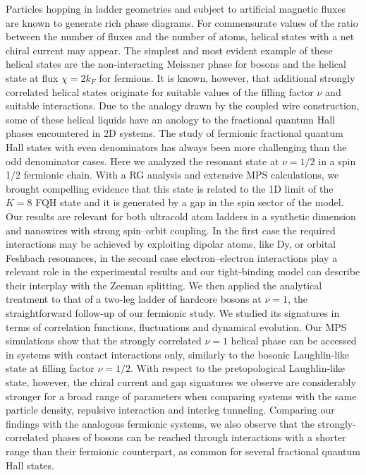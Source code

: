 Particles hopping in ladder geometries and subject to artificial magnetic fluxes are known to generate rich phase diagrams.
For commensurate values of the ratio between the number of fluxes and the number of atoms, helical states with a net chiral current may appear.
The simplest and most evident example of these helical states are the non-interacting Meissner phase for bosons and the helical state at flux $\chi = 2k_F$ for fermions.
It is known, however, that additional strongly correlated helical states originate for suitable values of the filling factor $\nu$ and suitable interactions.
Due to the analogy drawn by the coupled wire construction, some of these helical liquids have an anology to the fractional quantum Hall phases encountered in 2D systems.
The study of fermionic fractional quantum Hall states with even denominators has always been more challenging than the odd denominator cases.
Here we analyzed the resonant state at $\nu=1/2$ in a spin 1/2 fermionic chain.
With a RG analysis and extensive MPS calculations, we brought compelling evidence that this state is related to the 1D limit of the $K=8$ FQH state and it is generated by a gap in the spin sector of the model.
Our results are relevant for both ultracold atom ladders in a synthetic dimension and nanowires with strong spin–orbit coupling.
In the first case the required interactions may be achieved by exploiting dipolar atoms, like Dy, or orbital Feshbach resonances, in the second case electron–electron interactions play a relevant role in the experimental results and our tight-binding model can describe their interplay with the Zeeman splitting.
We then applied the analytical treatment to that of a two-leg ladder of hardcore bosons at $\nu=1$, the straightforward follow-up of our fermionic study.
We studied its signatures in terms of correlation functions, fluctuations and dynamical evolution.
Our MPS simulations show that the strongly correlated $\nu=1$ helical phase can be accessed in systems with contact interactions only, similarly to the bosonic Laughlin-like state at filling factor $\nu = 1/2$.
With respect to the pretopological Laughlin-like state, however, the chiral current and gap signatures we observe are considerably stronger for a broad range of parameters when comparing systems with the same particle density, repulsive interaction and interleg tunneling.
Comparing our findings with the analogous fermionic systems, we also observe that the strongly-correlated phases of bosons can be reached through interactions with a shorter range than their fermionic counterpart, as common for several fractional quantum Hall states.
